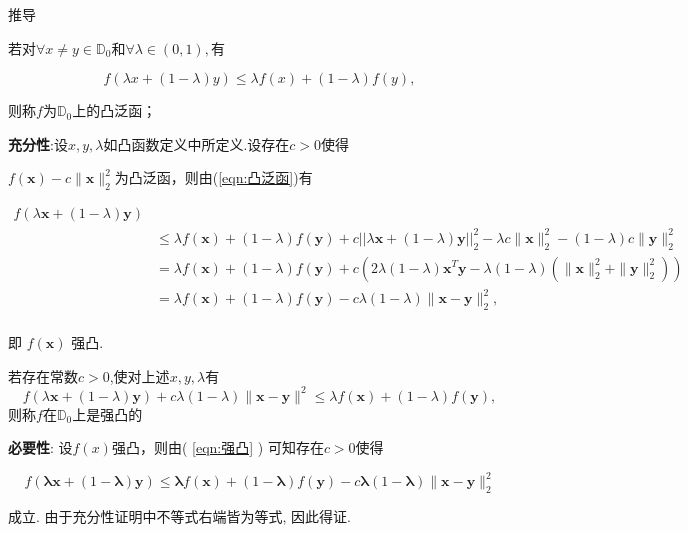 \documentclass{lzureport}
\begin{document}
\begin{derivation}{推导}
\begin{Thm}[凸泛函定义]
	若对$\forall x\neq y\in\mathbb{D}_0$和$\forall \lambda \in ( 0, 1) , \textbf{有 }$

	\begin{equation}\label{eqn:凸泛函}
	f(\lambda x+(1-\lambda)y)\leqslant\lambda f(x)+(1-\lambda)f(y),
	\end{equation}

则称$f$为$\mathbb{D}_0$上的凸泛函；
\end{Thm}

\textbf{充分性}:设$x,y,\lambda$如凸函数定义中所定义.设存在$c>0$使得

$f(\boldsymbol{x})-c\|\boldsymbol{x}\|_2^2$为凸泛函，则由(\ref{eqn:凸泛函})有

$$\begin{aligned}
f(\lambda\boldsymbol{x}+(1-\lambda)\boldsymbol{y})\\
&\leq\lambda f(\boldsymbol{x})+(1-\lambda)f(\boldsymbol{y})+c||\lambda\boldsymbol{x}+(1-\lambda)\boldsymbol{y}||_2^2-\lambda c\|\boldsymbol{x}\|_2^2-(1-\lambda)c\|\boldsymbol{y}\|_2^2\\
&=\lambda f(\boldsymbol{x})+(1-\lambda)f(\boldsymbol{y})+c(2\lambda(1-\lambda)\boldsymbol{x}^T\boldsymbol{y}-\lambda(1-\lambda)(\|\boldsymbol{x}\|_2^2+\|\boldsymbol{y}\|_2^2))\\
&=\lambda f(\boldsymbol{x})+(1-\lambda)f(\boldsymbol{y})-c\lambda(1-\lambda)\|\boldsymbol{x}-\boldsymbol{y}\|_2^2,\\
\end{aligned}$$

即 $f(\boldsymbol{x})$ 强凸.

\begin{Thm}[强凸定义]
	若存在常数$c>0$,使对上述$x,y,\lambda$有
	\begin{equation}\label{eqn:强凸}
	f(\lambda\boldsymbol{x}+(1-\lambda)\boldsymbol{y})+c\lambda(1-\lambda)\|\boldsymbol{x}-\boldsymbol{y}\|^2\leqslant\lambda f(\boldsymbol{x})+(1-\lambda)f(\boldsymbol{y}),
	\end{equation}
则称$f$在$\mathbb{D}_0$上是强凸的
\end{Thm}

\textbf{必要性}: 设$f(x)$强凸，则由( \ref{eqn:强凸} ) 可知存在$c> 0$使得

$$f(\boldsymbol{\lambda}\boldsymbol{x}+(1-\boldsymbol{\lambda})\boldsymbol{y})\leq\boldsymbol{\lambda}f(\boldsymbol{x})+(1-\boldsymbol{\lambda})f(\boldsymbol{y})-c\boldsymbol{\lambda}\left(1-\boldsymbol{\lambda}\right)\|\boldsymbol{x}-\boldsymbol{y}\|_2^2$$

成立. 由于充分性证明中不等式右端皆为等式, 因此得证.
\end{derivation}
\end{document}
